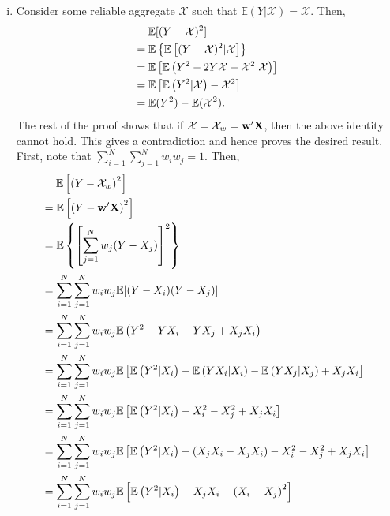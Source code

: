 \documentclass[12pt]{article}
\newcommand{\E}{\mathbb{E}}
\theoremstyle{definition}
\theoremstyle{definition}
\def\w{{\bf w}}
\def\X{{\bf X}}
\def\E{{\mathbb E}}
\begin{document}
\begin{enumerate}[i)]
\item Consider some reliable aggregate $\mathcal{X}$ such that $\E(Y | \mathcal{X}) = \mathcal{X}$. Then,
\begin{align*}
&\hspace{1.3em} \E[(Y-\mathcal{X})^2]\\
 &= \E\left\{\E\left[(Y-\mathcal{X})^2|\mathcal{X}\right]\right\}\\
&= \E\left[\E\left(Y^2-2Y\mathcal{X}+\mathcal{X}^2|\mathcal{X} \right)\right]\\
&= \E\left[\E\left(Y^2|\mathcal{X}\right)-\mathcal{X}^2\right]\\
&= \E(Y^2)-\E(\mathcal{X}^2).
\end{align*}
The rest of the proof shows that if $\mathcal{X} = \mathcal{X}_w = \w'\X$, then the above identity cannot hold. This gives a contradiction and hence proves the desired result. First, note that $\sum_{i=1}^N\sum_{j=1}^Nw_iw_j = 1$. Then,
\begin{align*}
&\hspace{1.3em}  \E\left[\left(Y-\mathcal{X}_w\right)^2\right]\\
 &= \E\left[\left(Y-\w'\X\right)^2\right] \\
 &= \E\left\{\left[\sum_{j=1}^Nw_j (Y-X_j)\right]^2\right\} \\
&= \sum_{i=1}^N\sum_{j=1}^Nw_iw_j \E[(Y-X_i)(Y-X_j)] \\
&= \sum_{i=1}^N\sum_{j=1}^Nw_iw_j \E\left(Y^2-YX_i-YX_j+X_jX_i\right) \\
&= \sum_{i=1}^N\sum_{j=1}^Nw_iw_j \E\left[ \E\left( Y^2|X_i \right)-\E\left( YX_i|X_i \right)-\E\left( YX_j|X_j\right)+X_jX_i \right] \\
&= \sum_{i=1}^N\sum_{j=1}^Nw_iw_j \E\left[ \E\left( Y^2|X_i \right)-X_i^2-X_j^2+X_jX_i \right] \\
&= \sum_{i=1}^N\sum_{j=1}^Nw_iw_j \E\left[\E\left(Y^2|X_i\right) +\left(X_jX_i-X_jX_i\right)-X_i^2-X_j^2+X_jX_i\right] \\
&= \sum_{i=1}^N\sum_{j=1}^Nw_iw_j \E\left[\E\left(Y^2|X_i\right) -X_jX_i-\left(X_i-X_j\right)^2\right] \\

\end{align*}
\end{enumerate}
\end{document}
